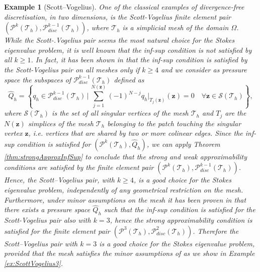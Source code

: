 \documentclass[USenglish]{article}
\theoremstyle{dgthm}
\theoremstyle{dgdef}
\newtheorem{example}{Example}
\let\vec\bm
\begin{document}
\begin{example}[Scott--Vogelius]
  One of the classical examples of divergence-free discretisation, in two dimensions, is the Scott-Vogelius finite element pair $\left(\vec{\mathcal{P}}^{k}(\mathcal{T}_h),\mathcal{P}^{k-1}_{disc}(\mathcal{T}_h)\right)$, where $\mathcal{T}_h$ is a simplicial mesh of the domain $\Omega$.
  While the Scott-.Vogelius pair seems the most natural choice for the Stokes eigenvalue problem, it is well known that the inf-sup condition is not satisfied by all $k\geq 1$.
  In fact, it has been shown in \cite{GuzmanScott,ScottVogelius} that the inf-sup condition is satisfied by the Scott-Vogelius pair on all meshes only if $k\geq 4$ and we consider as pressure space the subspaces of $\mathcal{P}^{k-1}_{disc}(\mathcal{T}_h)$ defined as
  \begin{equation}
    \hat{Q}_h = \left\{q_h\in \mathcal{P}^{k-1}_{disc}(\mathcal{T}_h)\,|\, \sum_{j=1}^{N(\vec{z})} (-1)^{N-j} q_h\big|_{T_j(\vec{z})}(\vec{z}) = 0 \quad \forall \vec{z}\in \mathcal{S}(\mathcal{T}_h)\right\},
  \end{equation}
  where $\mathcal{S}(\mathcal{T}_h)$ is the set of all singular vertices of the mesh $\mathcal{T}_h$ and $T_j$ are the $N(\vec{z})$ simplices of the mesh $\mathcal{T}_h$ belonging to the patch touching the singular vertex $\vec{z}$, i.e. vertices that are shared by two or more colinear edges. 
  Since the inf-sup condition is satisfied for $\left(\vec{\mathcal{P}}^{k}(\mathcal{T}_h),\hat{Q}_h\right)$, we can apply Theorem \ref{thm:strongApproxInfSup} to conclude that the strong and weak approximability conditions are satisfied by the finite element pair $\left(\vec{\mathcal{P}}^{k}(\mathcal{T}_h),\mathcal{P}^{k-1}_{disc}(\mathcal{T}_h)\right)$.
  Hence, the Scott--Vogelius pair, with $k\geq 4$, is a good choice for the Stokes eigenvalue problem, independently of any geometrical restriction on the mesh.
  Furthermore, under minor assumptions on the mesh it has been proven in \cite{GuzmanScott2} that there exists a pressure space $\hat{Q}_h$ such that the inf-sup condition is satisfied for the Scott-Vogelius pair also with $k=3$, hence the strong approximability condition is satisfied for the finite element pair $\left(\vec{\mathcal{P}}^{3}(\mathcal{T}_h),\mathcal{P}^{2}_{disc}(\mathcal{T}_h)\right)$.
  Therefore the Scott--Vogelius pair with $k=3$ is a good choice for the Stokes eigenvalue problem, provided that the mesh satisfies the minor assumptions of \cite{GuzmanScott2} as we show in Example \ref{ex:ScottVogelius3}.
\end{example}
\end{document}
